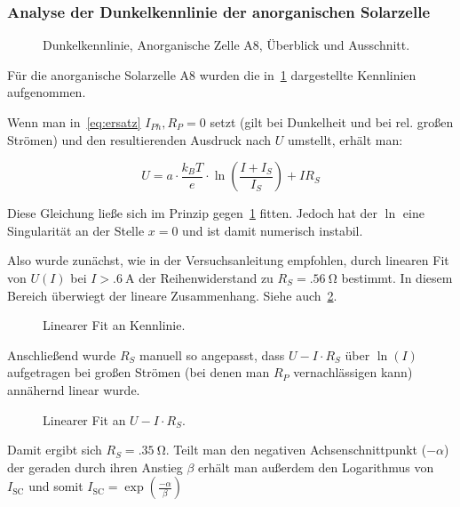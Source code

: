 \documentclass[slug=SZ, room=Hermann-Krone-Bau\,\ Labor\ 1.25,
supervisor=Martin\ Kroll, coursedate=14.\ 11.\ 2019]{../../Lab_Report_LaTeX/lab_report}
\newcommand{\isc}{I_{\text{SC}}}
\begin{document}
\subsubsection{Analyse der Dunkelkennlinie der anorganischen
  Solarzelle}
\label{sec:anordunkel}
\begin{figure}[H]\centering
  
  
  \caption{Dunkelkennlinie, Anorganische Zelle A8, \"Uberblick und Ausschnitt.}
  \label{fig:a-anorg-dunkel}
\end{figure}

F\"ur die anorganische Solarzelle A8 wurden die
in~\ref{fig:a-anorg-dunkel} dargestellte Kennlinien aufgenommen.

Wenn man in~\ref{eq:ersatz} \(I_{Ph}, R_{P}=0\) setzt (gilt bei
Dunkelheit und bei rel. gro\ss{}en Str\"omen) und den resultierenden Ausdruck
nach \(U\) umstellt, erh\"alt man:

\begin{equation}
  \label{eq:uofi}
  U=a\cdot\frac{k_BT}{e}\cdot\ln(\frac{I+I_S}{I_S})+IR_S
\end{equation}


Diese Gleichung ließe sich im Prinzip gegen~\ref{fig:a-anorg-dunkel}
fitten. Jedoch hat der \(\ln\) eine Singularit\"at an der Stelle
\(x=0\) und ist damit numerisch instabil.

Also wurde zun\"achst, wie in der Versuchsanleitung empfohlen, durch
linearen Fit von \(U(I)\) bei \(I>\SI{.6}{\ampere}\) der
Reihenwiderstand zu \(R_S=\SI{.56}{\ohm}\) bestimmt. In diesem Bereich
\"uberwiegt der lineare Zusammenhang. Siehe
auch~\ref{fig:a-anorg-lin}.

\begin{figure}[H]\centering
  
  \caption{Linearer Fit an Kennlinie.}
  \label{fig:a-anorg-lin}
\end{figure}

Anschließend wurde \(R_S\) manuell so angepasst, dass \(U-I\cdot
R_S\) \"uber \(\ln(I)\) aufgetragen bei gro\ss{}en Str\"omen (bei
denen man \(R_P\) vernachl\"assigen kann) ann\"ahernd linear wurde.

\begin{figure}[H]\centering
  
  \caption{Linearer Fit an \(U-I\cdot R_S\).}
  \label{fig:a-anorg-lin-log}
\end{figure}

Damit ergibt sich \(R_S=\SI{.35}{\ohm}\). Teilt man den negativen
Achsenschnittpunkt (\(-\alpha\)) der geraden durch ihren Anstieg \(\beta\) erhält man
au\ss{}erdem den Logarithmus von \(\isc\) und somit \(\isc=\exp(\frac{-\alpha}{\beta})\)
\end{document}
